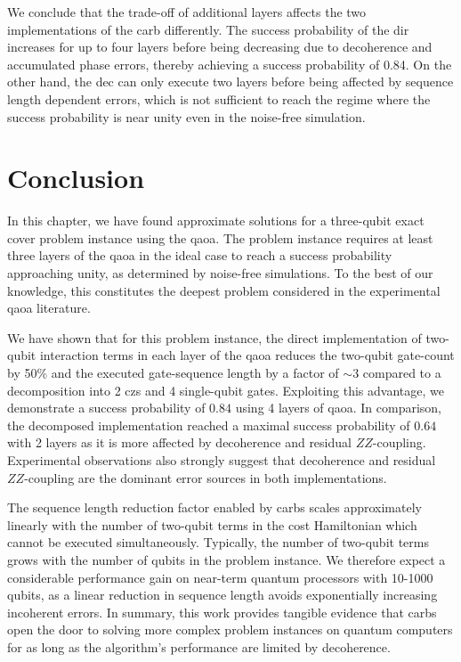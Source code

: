 We conclude that the trade-off of additional layers affects the two implementations of the \gls{carb} differently. The success probability of the \gls{dir} increases for up to four layers before being decreasing due to decoherence and accumulated phase errors, thereby achieving a success probability of 0.84. On the other hand, the \gls{dec} can only execute two layers before being affected by sequence length dependent errors, which is not sufficient to reach the regime where the success probability is near unity even in the noise-free simulation.

\section{Conclusion}

In this chapter, we have found approximate solutions for a three-qubit exact cover problem instance using the \gls{qaoa}. The problem instance requires at least three layers of the \gls{qaoa} in the ideal case to reach a success probability approaching unity, as determined by noise-free simulations. To the best of our knowledge, this constitutes the deepest problem considered in the experimental \gls{qaoa} literature. 

We have shown that for this problem instance, the direct implementation of two-qubit interaction terms in each layer of the \gls{qaoa} reduces the two-qubit gate-count by 50\% and the executed gate-sequence length by a factor of $\sim 3$ compared to a decomposition into 2 \glspl{cz} and 4 single-qubit gates. Exploiting this advantage, we demonstrate a success probability of $0.84$ using 4 layers of \gls{qaoa}. In comparison, the decomposed implementation reached a maximal success probability of $0.64$ with 2 layers as it is more affected by decoherence and residual $ZZ$-coupling. Experimental observations also strongly suggest that decoherence and residual $ZZ$-coupling are the dominant error sources in both implementations.

The sequence length reduction factor enabled by \glspl{carb} scales approximately linearly with the number of two-qubit terms in the cost Hamiltonian which cannot be executed simultaneously. Typically, the number of two-qubit terms grows with the number of qubits in the problem instance. We therefore expect a considerable performance gain on near-term quantum processors with 10-1000 qubits, as a linear reduction in sequence length avoids exponentially increasing incoherent errors.  In summary, this work provides tangible evidence that \glspl{carb} open the door to solving more complex problem instances on quantum computers for as long as the algorithm's performance are limited by decoherence. 

